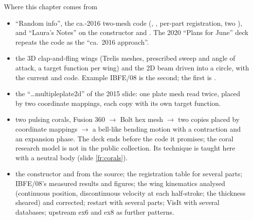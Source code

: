 \documentclass[aspectratio=169,11pt]{beamer}
\begin{document}
\begin{frame}{Where this chapter comes from}
\label{fr:sources}
\scriptsize
\begin{itemize}
  \item {} ``Random info'', the ca.-2016 two-mesh code (, , per-part registration, two ), and ``Laura's Notes'' on the constructor and . The 2020 ``Plans for June'' deck repeats the code as the ``ca.\ 2016 approach''.
  \item {} the 3D clap-and-fling wings (Trelis meshes, prescribed sweep and angle of attack, a target function per wing) and the 2D beam driven into a circle, with the current  and  code. Example IBFE/08 is the second; the first is .
  \item {} the ``\ldots multipleplate2d'' of the 2015 slide: one plate mesh read twice, placed by two coordinate mappings, each copy with its own target function.
  \item {} two pulsing corals, Fusion 360 $\to$ Bolt hex mesh $\to$ two copies placed by coordinate mappings $\to$ a bell-like bending motion with a contraction and an expansion phase. The deck ends before the code it promises; the coral research model is not in the public collection. Its technique is taught here with a neutral body (slide \ref{fr:corals}).
  \item {} the  constructor and  from the source; the registration table for several parts; IBFE/08's measured results and figures; the wing kinematics analysed (continuous position, discontinuous velocity at each half-stroke; the thickness sheared) and corrected; restart with several parts; VisIt with several databases; upstream ex6 and ex8 as further patterns.
\end{itemize}
\end{frame}
\end{document}
